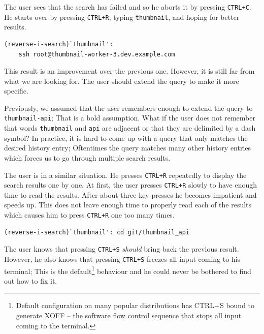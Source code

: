 \documentclass[thesis=M,english]{FITthesis}[2012/10/20]
\begin{document}
The user sees that the search has failed and so he aborts it by pressing \verb|CTRL+C|. He starts over by pressing \verb|CTRL+R|, typing \verb|thumbnail|, and hoping for better results.



\begin{verbatim}
(reverse-i-search)`thumbnail':
    ssh root@thumbnail-worker-3.dev.example.com
\end{verbatim}

This result is an improvement over the previous one. However, it is still far from what we are looking for. The user should extend the query to make it more specific. 

Previously, we assumed that the user remembers enough to extend the query to \verb|thumbnail-api|; That is a bold assumption. What if the user does not remember that words \verb|thumbnail| and \verb|api| are adjacent or that they are delimited by a dash symbol? In practice, it is hard to come up with a query that only matches the desired history entry; Oftentimes the query matches many other history entries which forces us to go through multiple search results.


The user is in a similar situation. He presses \verb|CTRL+R| repeatedly to display the search results one by one. At first, the user presses \verb|CTRL+R| slowly to have enough time to read the results. After about three key presses he becomes impatient and speeds up. This does not leave enough time to properly read each of the results which causes him to press \verb|CTRL+R| one too many times.

\begin{verbatim}
(reverse-i-search)`thumbnail': cd git/thumbnail_api
\end{verbatim}

The user knows that pressing \verb|CTRL+S| \textit{should} bring back the previous result. However, he also knows that pressing \verb|CTRL+S| freezes all input coming to his terminal; This is the default\footnote{Default configuration on many popular distributions has CTRL+S bound to generate XOFF -- the software flow control sequence that stops all input coming to the terminal.} behaviour and he could never be bothered to find out how to fix it.
\end{document}
